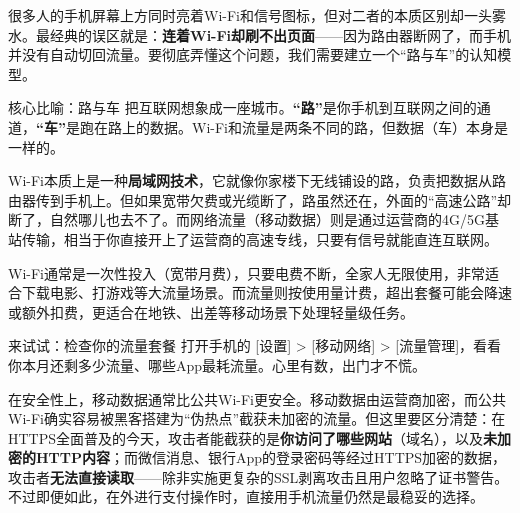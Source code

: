 


很多人的手机屏幕上方同时亮着Wi-Fi和信号图标，但对二者的本质区别却一头雾水。最经典的误区就是：\textbf{连着Wi-Fi却刷不出页面}——因为路由器断网了，而手机并没有自动切回流量。要彻底弄懂这个问题，我们需要建立一个“路与车”的认知模型。

\begin{tcbinfo}{核心比喻：路与车}
把互联网想象成一座城市。\textbf{“路”}是你手机到互联网之间的通道，\textbf{“车”}是跑在路上的数据。Wi-Fi和流量是两条不同的路，但数据（车）本身是一样的。

\end{tcbinfo}


Wi-Fi本质上是一种\textbf{局域网技术}，它就像你家楼下无线铺设的路，负责把数据从路由器传到手机上。但如果宽带欠费或光缆断了，路虽然还在，外面的“高速公路”却断了，自然哪儿也去不了。而网络流量（移动数据）则是通过运营商的4G/5G基站传输，相当于你直接开上了运营商的高速专线，只要有信号就能直连互联网。


Wi-Fi通常是一次性投入（宽带月费），只要电费不断，全家人无限使用，非常适合下载电影、打游戏等大流量场景。而流量则按使用量计费，超出套餐可能会降速或额外扣费，更适合在地铁、出差等移动场景下处理轻量级任务。

\begin{tcbpractice}{来试试：检查你的流量套餐}
打开手机的 [设置] > [移动网络] > [流量管理]，看看你本月还剩多少流量、哪些App最耗流量。心里有数，出门才不慌。

\end{tcbpractice}


在安全性上，移动数据通常比公共Wi-Fi更安全。移动数据由运营商加密，而公共Wi-Fi确实容易被黑客搭建为“伪热点”截获未加密的流量。但这里要区分清楚：在HTTPS全面普及的今天，攻击者能截获的是\textbf{你访问了哪些网站}（域名），以及\textbf{未加密的HTTP内容}；而微信消息、银行App的登录密码等经过HTTPS加密的数据，攻击者\textbf{无法直接读取}——除非实施更复杂的SSL剥离攻击且用户忽略了证书警告。不过即便如此，在外进行支付操作时，直接用手机流量仍然是最稳妥的选择。

